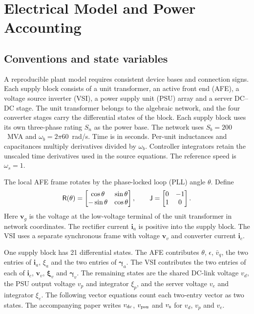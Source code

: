 \clearpage
\section{Electrical Model and Power Accounting}
\label{sec:electrical}
\subsection{Conventions and state variables}
A reproducible plant model requires consistent device bases and connection signs.
Each supply block consists of a unit transformer, an active front end (AFE), a voltage source inverter (VSI), a power supply unit (PSU) array and a server DC--DC stage.
The unit transformer belongs to the algebraic network, and the four converter stages carry the differential states of the block.
Each supply block uses its own three-phase rating $S_n$ as the power base.
The network uses $S_b=200$~MVA and $\omega_b=2\pi60$~rad/s.
Time is in seconds.
Per-unit inductances and capacitances multiply derivatives divided by $\omega_b$.
Controller integrators retain the unscaled time derivatives used in the source equations.
The reference speed is $\omega_s=1$.

The local AFE frame rotates by the phase-locked loop (PLL) angle $\theta$.
Define
\begin{equation}
\mathsf R(\theta)=\begin{bmatrix}\cos\theta&\sin\theta\\-\sin\theta&\cos\theta\end{bmatrix},\qquad
\mathsf J=\begin{bmatrix}0&-1\\1&0\end{bmatrix}.
\end{equation}
Here $\bm v_g$ is the voltage at the low-voltage terminal of the unit transformer in network coordinates.
The rectifier current $\bm i_a$ is positive into the supply block.
The VSI uses a separate synchronous frame with voltage $\bm v_v$ and converter current $\bm i_c$.

One supply block has 21 differential states.
The AFE contributes $\theta$, $\epsilon$, $\bar v_q$, the two entries of $\bm i_a$, $\xi_a$ and the two entries of $\bm\gamma_a$.
The VSI contributes the two entries of each of $\bm i_c$, $\bm v_v$, $\bm\xi_v$ and $\bm\gamma_v$.
The remaining states are the shared DC-link voltage $v_d$, the PSU output voltage $v_p$ and integrator $\xi_p$, and the server voltage $v_e$ and integrator $\xi_e$.
The following vector equations count each two-entry vector as two states.
The accompanying paper writes $v_{\rm dc}$, $v_{\rm psu}$ and $v_{\rm s}$ for $v_d$, $v_p$ and $v_e$.


